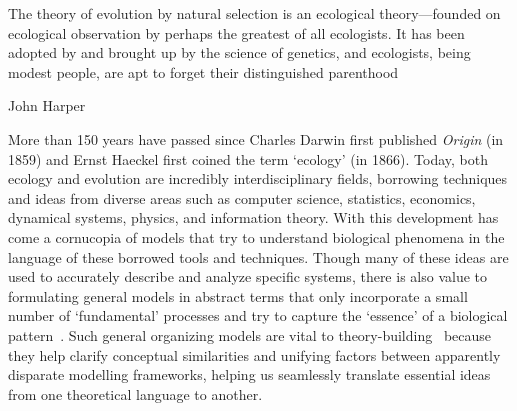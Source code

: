 \epigraph{\justifying The theory of evolution by natural selection is an ecological theory—founded on ecological observation by perhaps the greatest of all ecologists. It has been adopted by and brought up by the science of genetics, and ecologists, being modest people, are apt to forget their distinguished parenthood}{John Harper}

More than 150 years have passed since Charles Darwin first published \textit{Origin} (in 1859) and Ernst Haeckel first coined the term ‘ecology’ (in 1866). Today, both ecology and evolution are incredibly interdisciplinary fields, borrowing techniques and ideas from diverse areas such as computer science, statistics, economics, dynamical systems, physics, and information theory. With this development has come a cornucopia of models that try to understand biological phenomena in the language of these borrowed tools and techniques. Though many of these ideas are used to accurately describe and analyze specific systems, there is also value to formulating general models in abstract terms that only incorporate a small number of `fundamental' processes and try to capture the `essence' of a biological pattern~\citep{frank_natural_2012, vellend_theory_2016,luque_mirror_2021}. Such general organizing models are vital to theory-building~\citep{luque_mirror_2021} because they help clarify conceptual similarities and unifying factors between apparently disparate modelling frameworks, helping us seamlessly translate essential ideas from one theoretical language to another.

